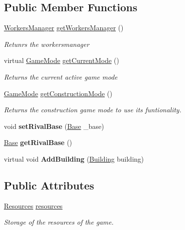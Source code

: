 \subsection*{Public Member Functions}
\begin{DoxyCompactItemize}
\item 
\mbox{\hyperlink{class_workers_manager}{Workers\+Manager}} \mbox{\hyperlink{class_player_a6f9664fa87f4c415c7dcdc4b54410d1e}{get\+Workers\+Manager}} ()
\begin{DoxyCompactList}\small\item\em Retunrs the workersmanager \end{DoxyCompactList}\item 
virtual \mbox{\hyperlink{class_game_mode}{Game\+Mode}} \mbox{\hyperlink{class_player_aaa2486d0dcaa57a4eb757b1e9d02d73f}{get\+Current\+Mode}} ()
\begin{DoxyCompactList}\small\item\em Returns the current active game mode \end{DoxyCompactList}\item 
\mbox{\hyperlink{class_game_mode}{Game\+Mode}} \mbox{\hyperlink{class_player_a564978fc1c003f5f2e74241a6de06d78}{get\+Construction\+Mode}} ()
\begin{DoxyCompactList}\small\item\em Returns the construction game mode to use its funtionality. \end{DoxyCompactList}\item 
\mbox{\label{class_player_a5f7760d9cc0bd9714af21538a0eef97e}} 
void {\bfseries set\+Rival\+Base} (\mbox{\hyperlink{class_base}{Base}} \+\_\+base)
\item 
\mbox{\label{class_player_a55fadb3cf934e3da90b2c207962adcbc}} 
\mbox{\hyperlink{class_base}{Base}} {\bfseries get\+Rival\+Base} ()
\item 
\mbox{\label{class_player_af2977bb82baa3dcf4631678f4e4b9a88}} 
virtual void {\bfseries Add\+Building} (\mbox{\hyperlink{class_building}{Building}} building)
\end{DoxyCompactItemize}
\subsection*{Public Attributes}
\begin{DoxyCompactItemize}
\item 
\mbox{\hyperlink{class_resources}{Resources}} \mbox{\hyperlink{class_player_a97bf2081445e8ee94ece51f2cd451c95}{resources}}
\begin{DoxyCompactList}\small\item\em Storage of the resources of the game. \end{DoxyCompactList}\end{DoxyCompactItemize}
